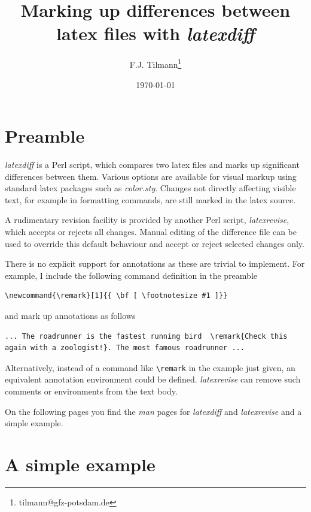 \documentclass[a4]{article}
\title{Marking up differences between latex files with {\em latexdiff}}
\author{F.J. Tilmann\thanks{tilmann@gfz-potsdam.de}}
\date{\today}
\begin{document}
\maketitle

\section*{Preamble}

{\em latexdiff} is a Perl script, which compares two
latex files and marks up significant differences between them.  Various options are available for visual markup using standard
latex packages such as {\em color.sty}. Changes not directly affecting visible
text, for example in formatting  commands, are still marked in the
latex source.

A rudimentary revision facility is provided by another Perl script,
{\em latexrevise}, which  accepts or rejects all changes.  Manual editing
of the difference file can be used to override this default behaviour
and accept or reject selected changes only.  

There is no explicit support for annotations as these are trivial to implement.
For example, I include the following command definition in the preamble
\begin{verbatim}
\newcommand{\remark}[1]{{ \bf [ \footnotesize #1 ]}}
\end{verbatim}
and mark up annotations as follows 
\begin{verbatim}
... The roadrunner is the fastest running bird  \remark{Check this 
again with a zoologist!}. The most famous roadrunner ...
\end{verbatim}
Alternatively, instead of a command like \verb#\remark# in the example just given, an
equivalent annotation environment could be defined.
{\em latexrevise} can  remove such comments or
environments from the text body.


On the following pages you find  the {\em man} pages for {\em
  latexdiff} and {\em latexrevise} and a simple example.







\section*{A simple example}
\end{document}
